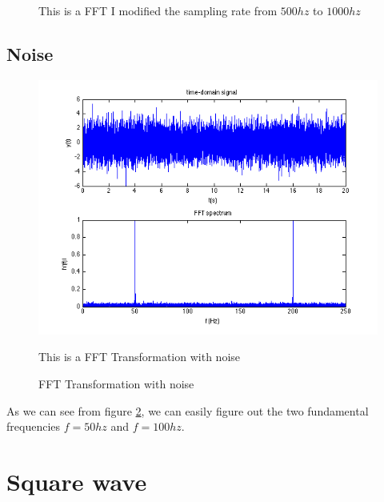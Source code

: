 \documentclass[11pt]{article}
\begin{document}
\begin{enumerate}
\begin{figure}[h!]
\label{img:sample_rate}
\begin{minipage}{0.75\textwidth}
{\footnotesize This is a FFT I modified the sampling rate from $500hz$ to $1000hz$}
\end{minipage}
\end{figure}
\FloatBarrier
  
\end{enumerate}

\subsection{Noise}
\FloatBarrier
\begin{figure}[h!]
\includegraphics[scale=0.75]{elec_3.png}
\caption{FFT Transformation with noise}

\label{img:noise}
\begin{minipage}{0.75\textwidth}
{\footnotesize This is a FFT Transformation with noise}
\end{minipage}
\end{figure}
\FloatBarrier
As we can see from figure \ref{img:noise}, we can easily figure out the two fundamental frequencies $f=50hz$ and $f=100hz$.

\section{Square wave}
\end{document}
